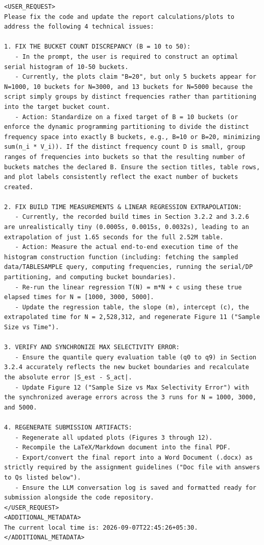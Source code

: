 \documentclass[11pt,a4paper]{article}
\begin{document}
\begin{lstlisting}[language=text]
<USER_REQUEST>
Please fix the code and update the report calculations/plots to address the following 4 technical issues:

1. FIX THE BUCKET COUNT DISCREPANCY (B = 10 to 50):
   - In the prompt, the user is required to construct an optimal serial histogram of 10-50 buckets.
   - Currently, the plots claim "B=20", but only 5 buckets appear for N=1000, 10 buckets for N=3000, and 13 buckets for N=5000 because the script simply groups by distinct frequencies rather than partitioning into the target bucket count.
   - Action: Standardize on a fixed target of B = 10 buckets (or enforce the dynamic programming partitioning to divide the distinct frequency space into exactly B buckets, e.g., B=10 or B=20, minimizing sum(n_i * V_i)). If the distinct frequency count D is small, group ranges of frequencies into buckets so that the resulting number of buckets matches the declared B. Ensure the section titles, table rows, and plot labels consistently reflect the exact number of buckets created.

2. FIX BUILD TIME MEASUREMENTS & LINEAR REGRESSION EXTRAPOLATION:
   - Currently, the recorded build times in Section 3.2.2 and 3.2.6 are unrealistically tiny (0.0005s, 0.0015s, 0.0032s), leading to an extrapolation of just 1.65 seconds for the full 2.52M table.
   - Action: Measure the actual end-to-end execution time of the histogram construction function (including: fetching the sampled data/TABLESAMPLE query, computing frequencies, running the serial/DP partitioning, and computing bucket boundaries).
   - Re-run the linear regression T(N) = m*N + c using these true elapsed times for N = [1000, 3000, 5000].
   - Update the regression table, the slope (m), intercept (c), the extrapolated time for N = 2,528,312, and regenerate Figure 11 ("Sample Size vs Time").

3. VERIFY AND SYNCHRONIZE MAX SELECTIVITY ERROR:
   - Ensure the quantile query evaluation table (q0 to q9) in Section 3.2.4 accurately reflects the new bucket boundaries and recalculate the absolute error |S_est - S_act|.
   - Update Figure 12 ("Sample Size vs Max Selectivity Error") with the synchronized average errors across the 3 runs for N = 1000, 3000, and 5000.

4. REGENERATE SUBMISSION ARTIFACTS:
   - Regenerate all updated plots (Figures 3 through 12).
   - Recompile the LaTeX/Markdown document into the final PDF.
   - Export/convert the final report into a Word Document (.docx) as strictly required by the assignment guidelines ("Doc file with answers to Qs listed below").
   - Ensure the LLM conversation log is saved and formatted ready for submission alongside the code repository.
</USER_REQUEST>
<ADDITIONAL_METADATA>
The current local time is: 2026-09-07T22:45:26+05:30.
</ADDITIONAL_METADATA>
\end{lstlisting}
\end{document}
